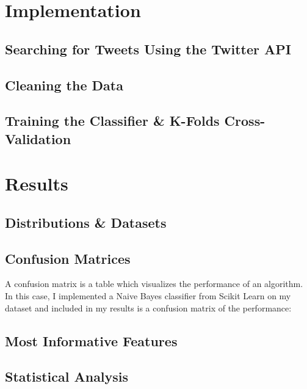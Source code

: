 \documentclass[11pt, twoside, reqno]{book}
\begin{document}
\chapter{Implementation}
\label{implementation}

\section{Searching for Tweets Using the Twitter API}
\label{searching_with_api}

\section{Cleaning the Data}
\label{cleaning_data}

\section{Training the Classifier \& K-Folds Cross-Validation}
\label{training_and_k_folds}

\chapter{Results}
\label{results}

\section{Distributions \& Datasets}
\label{distributions_and_datasets}

\section{Confusion Matrices}
\label{confusion_matrices}

A confusion matrix is a table which visualizes the performance of an algorithm. In this case, I implemented a Naive Bayes classifier from Scikit Learn on my dataset and included in my results is a confusion matrix of the performance:

\section{Most Informative Features}
\label{most_informative_features}

\section{Statistical Analysis}
\label{statistical_analysis}
\end{document}
